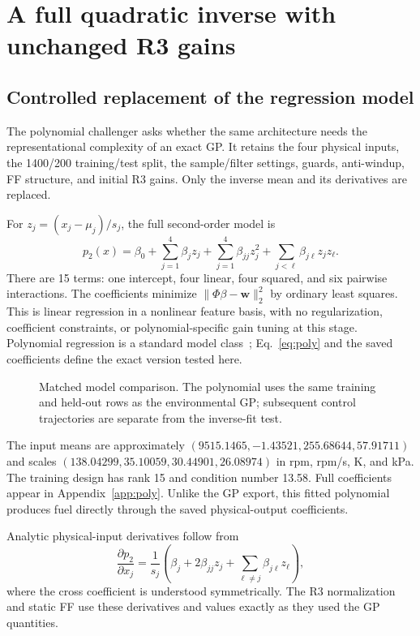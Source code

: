 \documentclass[11pt,a4paper,oneside]{report}
\newcommand{\blockfig}[3]{\begin{figure}[htbp]\centering\resizebox{.98\linewidth}{!}{#1}\caption{#2}\label{fig:#3}\end{figure}}
\begin{document}
\chapter{A full quadratic inverse with unchanged R3 gains}
\section{Controlled replacement of the regression model}
The polynomial challenger asks whether the same architecture needs the representational complexity of an exact GP. It retains the four physical inputs, the 1400/200 training/test split, the sample/filter settings, guards, anti-windup, FF structure, and initial R3 gains. Only the inverse mean and its derivatives are replaced.

For $z_j=(x_j-\mu_j)/s_j$, the full second-order model is
\begin{equation}
p_2(x)=\beta_0+\sum_{j=1}^4\beta_jz_j+
\sum_{j=1}^4\beta_{jj}z_j^2+
\sum_{j<\ell}\beta_{j\ell}z_jz_\ell.
\label{eq:poly}
\end{equation}
There are 15 terms: one intercept, four linear, four squared, and six pairwise interactions. The coefficients minimize $\|\Phi\beta-\bm w\|_2^2$ by ordinary least squares. This is linear regression in a nonlinear feature basis, with no regularization, coefficient constraints, or polynomial-specific gain tuning at this stage. Polynomial regression is a standard model class~\cite{isl}; Eq.~\eqref{eq:poly} and the saved coefficients define the exact version tested here.

\blockfig{\diagramIdentification}{Matched model comparison. The polynomial uses the same training and held-out rows as the environmental GP; subsequent control trajectories are separate from the inverse-fit test.}{identification}

The input means are approximately $(9515.1465,-1.43521,255.68644,57.91711)$ and scales $(138.04299,35.10059,30.44901,26.08974)$ in rpm, rpm/s, K, and kPa. The training design has rank 15 and condition number 13.58. Full coefficients appear in Appendix~\ref{app:poly}. Unlike the GP export, this fitted polynomial produces fuel directly through the saved physical-output coefficients.

Analytic physical-input derivatives follow from
\begin{equation}
\frac{\partial p_2}{\partial x_j}=\frac1{s_j}
\left(\beta_j+2\beta_{jj}z_j+\sum_{\ell\ne j}\beta_{j\ell}z_\ell\right),
\end{equation}
where the cross coefficient is understood symmetrically. The R3 normalization and static FF use these derivatives and values exactly as they used the GP quantities.
\end{document}
